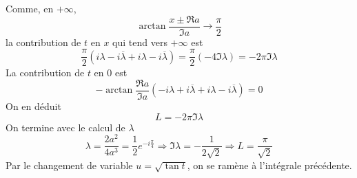 Comme, en $+\infty$, 
\begin{displaymath}
  \arctan \frac{x\pm \Re a}{\Im a} \rightarrow \frac{\pi}{2}
\end{displaymath}
la contribution de $t$ en $x$ qui tend vers $+\infty$ est
\begin{displaymath}
  \frac{\pi}{2}\left( i\lambda - i\overline{\lambda} + i\lambda - i\overline{\lambda}\right)  = 
\frac{\pi}{2}\left(-4\Im \lambda\right)  = -2\pi \Im \lambda
\end{displaymath}
La contribution de $t$ en $0$ est
\begin{displaymath}
-\arctan\frac{\Re a}{\Im a}\left( -i\lambda  + i\overline{\lambda} 
+i\lambda - i\overline{\lambda} \right) = 0
\end{displaymath}
On en déduit
\begin{displaymath}
  L = -2\pi \Im \lambda 
\end{displaymath}
On termine avec le calcul de $\lambda$ 
\begin{displaymath}
  \lambda = \frac{2a^2}{4a^3} = \frac{1}{2}e^{-i\frac{\pi}{4}}
\Rightarrow \Im \lambda = -\frac{1}{2\sqrt{2}} 
\Rightarrow L = \frac{\pi}{\sqrt{2}}
\end{displaymath}
Par le changement de variable $u=\sqrt{\tan t}$, on se ramène à l'intégrale précédente.
